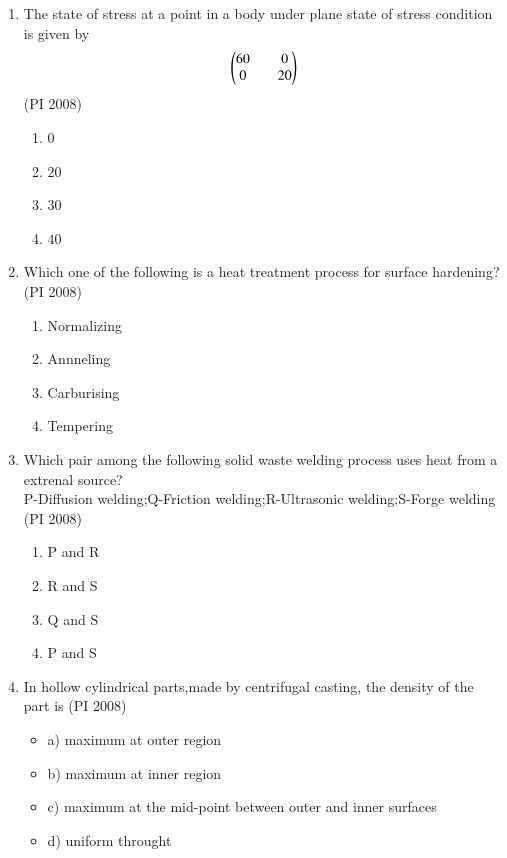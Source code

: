 \documentclass[journal,12pt,onecolumn]{IEEEtran}
\theoremstyle{remark}
\begin{document}
\begin{enumerate}
\begin{multicols}{4}
\begin{enumerate}
    \end{enumerate}
\end{multicols}
\vspace{1cm}
\item %
The state of stress at a point in a body under plane state of stress condition is given by\[ \begin{pmatrix}
60 && 0 \\
0 && 20
\end{pmatrix}\]
    \hfill{(PI 2008)}
    \begin{multicols}{4}
    \begin{enumerate}
        \item $0$
        \item $20$
        \item $30$
        \item $40$
    \end{enumerate}
\end{multicols}
\vspace{1cm}
\item %
Which one of the following is a heat treatment process for surface hardening?
    \hfill{(PI 2008)}
    \begin{multicols}{4}
    \begin{enumerate}
        \item Normalizing
        \item Annneling
        \item Carburising
        \item Tempering
    \end{enumerate}
\end{multicols}
\vspace{1cm}
\item  %
Which pair among the following solid waste welding process uses heat from a extrenal source?\\
P-Diffusion welding;Q-Friction welding;R-Ultrasonic welding;S-Forge welding
    \hfill{(PI 2008)}
    \begin{multicols}{4}
    \begin{enumerate}
        \item P and R
        \item R and S
        \item Q and S
        \item P and S
    \end{enumerate}
\end{multicols}
\vspace{1cm}
\item  %
In hollow cylindrical parts,made by centrifugal casting, the density of the part is 
    \hfill{(PI 2008)}
   \begin{itemize}[label={}]
        \item a) maximum at outer region
        \item b) maximum at inner region
        \item c) maximum at the mid-point between outer and inner surfaces
        \item d) uniform throught
    \end{itemize}
\vspace{1cm}


\end{enumerate}
\end{document}
